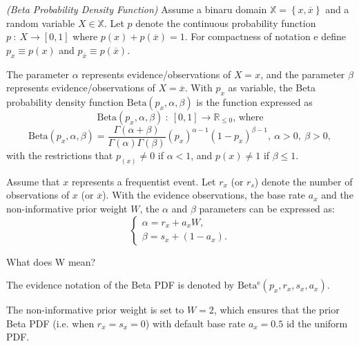 \begin{definition}
	\emph{(Beta Probability Density Function)} Assume a binaru domain $\mathbb{X} = \left\{x,\overline{x}\right\}$ and a random variable $X \in \mathbb{X}$. Let $p$ denote the continuous probability function $p\ :\ X \rightarrow \left[0,1\right]$ where $p(x) + p(\overline{x}) = 1$. For compactness of notation e define $p_x \equiv p\left(x\right)$ and $p_{\overline{x}} \equiv p\left(\overline{x}\right)$.

	The parameter $\alpha$ represents evidence/observations of $X = x$, and the parameter $\beta$ represents evidence/observations of $X = \overline{x}$. With $p_x$ as variable, the Beta probability density function $\mathrm{Beta}(p_x, \alpha, \beta)$ is the function expressed as
	\begin{equation}
		\mathrm{Beta}(p_x, \alpha, \beta)\ :\ [0, 1] \rightarrow \mathbb{R}_{\leq0}\text{, where}
	\end{equation}
	\begin{equation}
		\mathrm{Beta}(p_x, \alpha, \beta) = \dfrac{\Gamma(\alpha + \beta)}{\Gamma(\alpha)\Gamma(\beta)}(p_x)^{\alpha - 1}(1 - p_x)^{\beta - 1},\ \alpha > 0,\ \beta > 0,
	\end{equation}
	with the restrictions that $p_(x) \neq 0$ if $\alpha < 1$, and $p(x) \neq 1$ if $\beta \leq 1$.
\end{definition}

Assume that $x$ represents a frequentist event. Let $r_x$ (or $r_s$) denote the number of observations of $x$ (or $\overline{x}$). With the evidence observations, the base rate $a_x$ and the non-informative prior weight $W$, the $\alpha$ and $\beta$ parameters can be expressed as:
\begin{equation}
	\begin{cases}
		\alpha = r_x + a_x W\text{,} \\
		\beta = s_x + (1 - a_x)\text{.}
	\end{cases}
\end{equation}

\begin{question}
	What does W mean?
\end{question}

The evidence notation of the Beta PDF is denoted by $\mathrm{Beta^e}(p_x, r_x, s_x, a_x)$.

The non-informative prior weight is set to $W = 2$, which ensures that the prior Beta PDF (i.e. when $r_x = s_x = 0$) with default base rate $a_x = 0.5$ id the uniform PDF.

